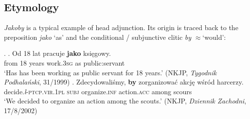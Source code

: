 \documentclass[output=paper
,modfonts
,nonflat]{langsci/langscibook}
\newcommand{\glossformat}[1]{\textsc{#1}}
\newcommand{\firstperson}{\glossformat{1}\xspace}
\newcommand{\thirdperson}{\glossformat{3}\xspace}
\newcommand{\acc}{\glossformat{acc}\xspace}
\newcommand{\infv}{\glossformat{inf}\xspace}
\newcommand{\lptcp}{\emph{l}\glossformat{-ptcp}\xspace}
\newcommand{\pl}{\glossformat{pl}\xspace}
\newcommand{\sg}{\glossformat{sg}\xspace}
\newcommand{\subj}{\glossformat{subj}\xspace}
\newcommand{\vir}{\glossformat{vir}\xspace}
\newcommand{\nquelle}[1]{\newline\phantom{x}\hfill(#1)}
\begin{document}
\subsection{Etymology}

\emph{Jakoby} is a typical example of head adjunction. Its origin is traced back to the preposition \emph{jako} `as' and the conditional / subjunctive clitic \emph{by} $\approx$`would': 

\ex.	\ag.	Od 18 lat pracuje \textbf{jako} księgowy. \\
		from 18 years work.{\thirdperson}{\sg} as {public:servant} \\
		`Has has been working as public servant for 18 years.' \nquelle{NKJP, \emph{Tygodnik Podhalański}, 31/1999}
	\bg.	Zdecydowaliśmy, \textbf{by} zorganizować akcję wśród harcerzy. \label{pasek} \\
		decide.{\lptcp}.{\vir}.{\firstperson}{\pl} {\subj} organize.{\infv} action.{\acc} among scours \\
		 `We decided to organize an action among the scouts.' \nquelle{NKJP, \emph{Dziennik Zachodni}, 17/8/2002}
\end{document}
